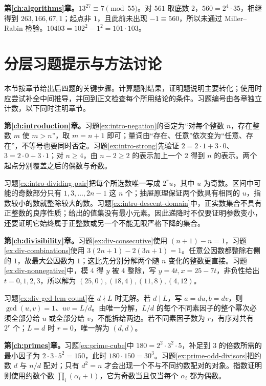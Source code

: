 \documentclass[UTF8,12pt,a4paper,fontset=fandol]{ctexbook}
\begin{document}
\textbf{第\ref{ch:algorithms}章。}$13^{27}\equiv7\pmod{55}$。对 $561$ 取底数 $2$，$560=2^4\cdot35$，相继得到 $263,166,67,1$；起点非 $1$，且此前未出现 $-1\equiv560$，所以未通过 Miller--Rabin 检验。$10403=102^2-1^2=101\cdot103$。

\section{分层习题提示与方法讨论}

本节按章节给出后四题的关键步骤。计算题附结果，证明题说明主要转化；使用时应尝试补全中间推导，并回到正文检查每个所用结论的条件。习题编号由各章独立计数，以下同时注明章节。

\textbf{第\ref{ch:introduction}章。}习题\ref{ex:intro-negation}的否定为“对每个整数 $n$，存在整数 $m$ 使 $m>n$”，取 $m=n+1$ 即可；量词由“存在、任意”依次变为“任意、存在”，不等号也要同时否定。习题\ref{ex:intro-strong}先验证 $2=2\cdot1+3\cdot0$、$3=2\cdot0+3\cdot1$；对 $n\ge4$，由 $n-2\ge2$ 的表示加上一个 $2$ 得到 $n$ 的表示。两个起点分别覆盖之后的偶数与奇数。

习题\ref{ex:intro-dividing-pair}把每个所选数唯一写成 $2^ru$，其中 $u$ 为奇数。区间中可能的奇数部分只有 $1,3,\ldots,2n-1$ 这 $n$ 个；抽屉原理保证两个数具有相同的 $u$，指数较小的数就整除较大的数。习题\ref{ex:intro-descent-domain}中，正实数集合不具有正整数的良序性质；给出的值集没有最小元素。因此递降时不仅要证明参数变小，还要证明它始终属于正整数或另一个不能无限严格下降的集合。

\textbf{第\ref{ch:divisibility}章。}习题\ref{ex:div-consecutive}使用 $(n+1)-n=1$，习题\ref{ex:div-combinations}使用 $3(2n+1)-2(3n+1)=1$。任意公因数都整除右侧的 $1$，故最大公因数为 $1$；这比先分别分解两个随 $n$ 变化的整数更直接。习题\ref{ex:div-nonnegative}中，模 $4$ 得 $y$ 被 $4$ 整除，写 $y=4t,x=25-7t$，非负性给出 $t=0,1,2,3$，所以解为 $(25,0),(18,4),(11,8),(4,12)$。

习题\ref{ex:div-gcd-lcm-count}在 $d\nmid L$ 时无解。若 $d\mid L$，写 $a=du,b=dv$，则 $\gcd(u,v)=1$、$uv=L/d$。由唯一分解，$L/d$ 的每个不同素因子的整个幂次必须全部分给 $u$ 或全部分给 $v$，不能拆给两边。若不同素因子数为 $r$，有序对共有 $2^r$ 个；$L=d$ 时 $r=0$，唯一解为 $(d,d)$。

\textbf{第\ref{ch:primes}章。}习题\ref{ex:prime-cube}中 $180=2^2\cdot3^2\cdot5$，补足到 $3$ 的倍数所需的最小因子为 $2\cdot3\cdot5^2=150$，此时 $180\cdot150=30^3$。习题\ref{ex:prime-odd-divisors}把约数 $d$ 与 $n/d$ 配对；只有 $d^2=n$ 才会出现一个不与不同约数配对的对象。指数证明则使用约数个数 $\prod_i(\alpha_i+1)$，它为奇数当且仅当每个 $\alpha_i$ 都为偶数。
\end{document}
